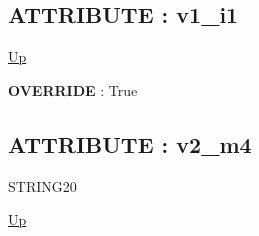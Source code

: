 \subsection*{ATTRIBUTE : v1\_i1}
\hypertarget{ecldoc:intest.in1intest.example_2.mod_4.v1_i1}{}
\par
\begin{minipage}[t]{\textwidth}
\begin{flushleft}
  
\end{flushleft}
\end{minipage}
\hyperlink{ecldoc:intest.in1intest.example_2.mod_4}{Up} \\
\par
\par
\textbf{OVERRIDE} : True \\
\subsection*{ATTRIBUTE : v2\_m4}
\hypertarget{ecldoc:intest.in1intest.example_2.mod_4.v2_m4}{}
\par
\begin{minipage}[t]{\textwidth}
\begin{flushleft}
STRING20  
\end{flushleft}
\end{minipage}
\hyperlink{ecldoc:intest.in1intest.example_2.mod_4}{Up} \\
\par
\par


